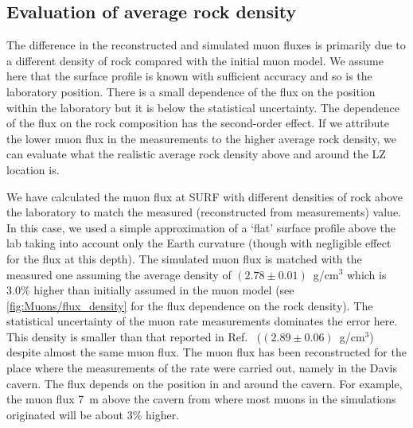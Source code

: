 \subsection{Evaluation of average rock density}\label{sec:Muons/RockDensity}

The difference in the reconstructed and simulated muon fluxes is primarily due to a different density of rock compared with the initial muon model. We assume here that the surface profile is known with sufficient accuracy and so is the laboratory position. There is a small dependence of the flux on the position within the laboratory but it is below the statistical uncertainty. The dependence of the flux on the rock composition has the second-order effect. If we attribute the lower muon flux in the measurements to the higher average rock density, we can evaluate what the realistic average rock density above and around the LZ location is. 

We have calculated the muon flux at SURF with different densities of rock above the laboratory to match the measured (reconstructed from measurements) value. In this case, we used a simple approximation of a `flat' surface profile above the lab taking into account only the Earth curvature (though with negligible effect for the flux at this depth). The simulated muon flux is matched with the measured one assuming the average density of $(2.78 \pm 0.01)$~g/cm$^3$ which is 3.0\% higher than initially assumed in the muon model (see \autoref{fig:Muons/flux_density} for the flux dependence on the rock density). The statistical uncertainty of the muon rate measurements dominates the error here. This density is smaller than that reported in Ref.~\cite{majorana} ($(2.89 \pm 0.06)$~g/cm$^3$) despite almost the same muon flux. 
The muon flux has been reconstructed for the place where the measurements of the rate were carried out, namely in the Davis cavern. The flux depends on the position in and around the cavern. For example, the muon flux 7~m above the cavern from where most muons in the simulations originated will be about 3\% higher. 


